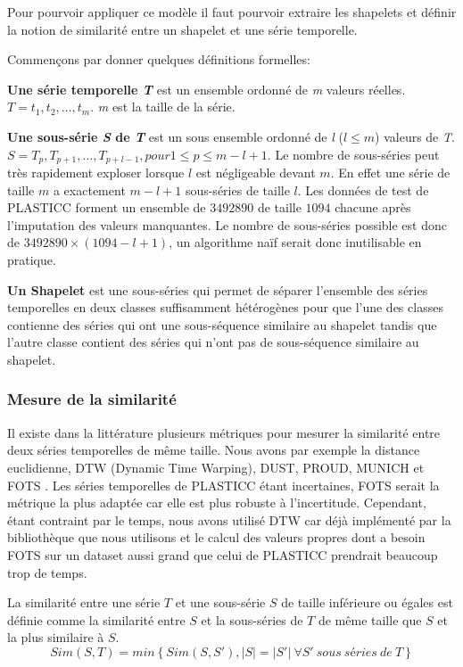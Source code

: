 Pour pourvoir appliquer ce modèle il faut pourvoir extraire les shapelets et définir la notion de similarité entre un shapelet et une série temporelle.

Commençons par donner quelques définitions formelles:

\textbf{Une série temporelle \textit{T}} est un ensemble ordonné de \textit{m} valeurs réelles. $ T = t_1, t_2,...,t_m $. \textit{m} est la taille de la série.

\textbf{Une sous-série \textit{S} de \textit{T}} est un sous ensemble ordonné de \textit{l} ($ l \leq m $) valeurs de \textit{T}. $ S = T_p, T_{p+1},..., T_{p+l-1}, pour 1 \leq p \leq m-l+1 $. Le nombre de sous-séries peut très rapidement exploser lorsque $l$ est négligeable devant $m$. En effet une série de taille $m$ a exactement $ m-l+1 $ sous-séries de taille $l$. Les données de test de PLASTICC forment un ensemble de $ 3492890 $ de taille $1094$ chacune après l'imputation des valeurs manquantes. Le nombre de sous-séries possible est donc de $ 3492890 \times (1094 - l + 1)$, un algorithme naïf serait donc inutilisable en pratique.

\textbf{Un Shapelet} est une sous-séries qui permet de séparer l'ensemble des séries temporelles en deux classes suffisamment hétérogènes pour que l'une des classes contienne des séries qui ont une sous-séquence similaire au shapelet tandis que l'autre classe contient des séries qui n'ont pas de sous-séquence similaire au shapelet\cite{fotso2018frobenius}. 

\subsubsection{Mesure de la similarité}
Il existe dans la littérature plusieurs métriques pour mesurer la similarité entre deux séries temporelles de même taille. Nous avons par exemple la distance euclidienne, DTW (Dynamic Time Warping), DUST, PROUD, MUNICH et FOTS \cite{fotso2018frobenius}. Les séries temporelles de PLASTICC étant incertaines, FOTS serait la métrique la plus adaptée car elle est plus robuste à l'incertitude. Cependant, étant contraint par le temps, nous avons utilisé DTW car déjà implémenté par la bibliothèque que nous utilisons et le calcul des valeurs propres dont a besoin FOTS sur un dataset aussi grand que celui de PLASTICC prendrait beaucoup trop de temps.

La similarité entre une série $ T $ et une sous-série $ S $ de taille inférieure ou égales est définie comme la similarité entre $ S $ et la sous-séries de $ T $ de même taille que $ S $ et la plus similaire à $ S $. 
$$
Sim(S, T) = min \left \{ Sim(S, S'), |S|=|S'| \:  \forall S'\: sous \: séries \: de \: T \right \}
$$

